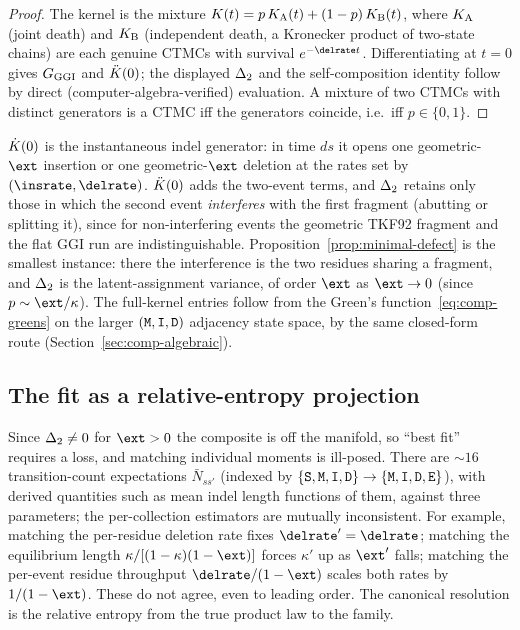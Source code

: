 \begin{proof}
The kernel is the mixture
$K(t)=p\,K_{\mathrm A}(t)+(1-p)\,K_{\mathrm B}(t)$,
where $K_{\mathrm A}$ (joint death) and $K_{\mathrm B}$
(independent death, a Kronecker product of two-state chains) are each
genuine CTMCs with survival $e^{-\delrate t}$.  Differentiating at $t=0$
gives $G_{\mathrm{GGI}}$ and $\ddot{K}(0)$; the displayed $\Delta_2$ and the
self-composition identity follow by direct (computer-algebra-verified)
evaluation.  A mixture of two CTMCs with distinct generators is a CTMC iff
the generators coincide, i.e.\ iff $p\in\{0,1\}$.
\end{proof}

\begin{remark}
$\dot{K}(0)$ is the instantaneous indel generator: in time $ds$ it
opens one geometric-$\ext$ insertion or one geometric-$\ext$ deletion at
the rates set by $(\insrate,\delrate)$.  $\ddot{K}(0)$ adds the
two-event terms, and $\Delta_2$ retains only those in which the second
event \emph{interferes} with the first fragment (abutting or splitting it),
since for non-interfering events the geometric TKF92 fragment and the flat
GGI run are indistinguishable.  Proposition~\ref{prop:minimal-defect} is
the smallest instance: there the interference is the two residues sharing a
fragment, and $\Delta_2$ is the latent-assignment variance, of order
$\ext$ as $\ext\to 0$ (since $p\sim\ext/\kappa$).  The full-kernel entries
follow from the Green's function~\eqref{eq:comp-greens} on the larger
$(\mathtt{M},\mathtt{I},\mathtt{D})$ adjacency state space, by the same closed-form route
(Section~\ref{sec:comp-algebraic}).
\end{remark}

\subsection{The fit as a relative-entropy projection}
\label{sec:comp-kl}

Since $\Delta_2\neq0$ for $\ext>0$ the composite is off the manifold, so
``best fit'' requires a loss, and matching individual moments is ill-posed.
There are $\sim\!16$ transition-count expectations $\bar N_{ss'}$ (indexed
by $\{\mathtt{S},\mathtt{M},\mathtt{I},\mathtt{D}\}\to\{\mathtt{M},\mathtt{I},\mathtt{D},\mathtt{E}\}$), with derived
quantities such as mean indel length functions of them, against three
parameters; the per-collection estimators are mutually inconsistent.  For
example, matching the per-residue deletion rate fixes $\delrate'=\delrate$;
matching the equilibrium length $\kappa/[(1-\kappa)(1-\ext)]$ forces
$\kappa'$ up as $\ext'$ falls; matching the per-event residue throughput
$\delrate/(1-\ext)$ scales both rates by $1/(1-\ext)$.  These do not agree,
even to leading order.  The canonical resolution is the relative entropy
from the true product law to the family.

